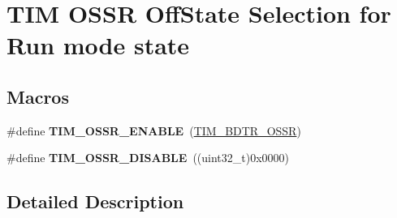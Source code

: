 \hypertarget{group___t_i_m___o_s_s_r___off___state___selection__for___run__mode__state}{}\section{T\+IM O\+S\+SR Off\+State Selection for Run mode state}
\label{group___t_i_m___o_s_s_r___off___state___selection__for___run__mode__state}
\subsection*{Macros}
\begin{DoxyCompactItemize}
\item 
\#define {\bfseries T\+I\+M\+\_\+\+O\+S\+S\+R\+\_\+\+E\+N\+A\+B\+LE}~(\hyperlink{group___peripheral___registers___bits___definition_gaf9435f36d53c6be1107e57ab6a82c16e}{T\+I\+M\+\_\+\+B\+D\+T\+R\+\_\+\+O\+S\+SR})\hypertarget{group___t_i_m___o_s_s_r___off___state___selection__for___run__mode__state_ga5d21918f173eca946748a1fbc177daa5}{}\label{group___t_i_m___o_s_s_r___off___state___selection__for___run__mode__state_ga5d21918f173eca946748a1fbc177daa5}

\item 
\#define {\bfseries T\+I\+M\+\_\+\+O\+S\+S\+R\+\_\+\+D\+I\+S\+A\+B\+LE}~((uint32\+\_\+t)0x0000)\hypertarget{group___t_i_m___o_s_s_r___off___state___selection__for___run__mode__state_gae11820b467ef6d74c90190c8cfce5e73}{}\label{group___t_i_m___o_s_s_r___off___state___selection__for___run__mode__state_gae11820b467ef6d74c90190c8cfce5e73}

\end{DoxyCompactItemize}


\subsection{Detailed Description}
